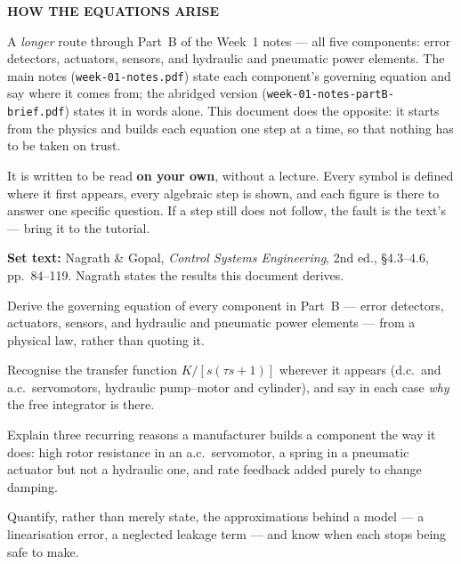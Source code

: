 \documentclass[11pt,a4paper]{article}
\begin{document}
\weektitle

\begin{center}
{\large\sffamily\bfseries\color{fnavy}HOW THE EQUATIONS ARISE}
\end{center}

\bigskip
\begin{readingbox}
A \emph{longer} route through Part~B of the Week~1 notes --- all five
components: error detectors, actuators, sensors, and hydraulic and pneumatic
power elements. The main notes (\texttt{week-01-notes.pdf}) state each
component's governing equation and say where it comes from; the abridged
version (\texttt{week-01-notes-partB-brief.pdf}) states it in words alone.
This document does the opposite: it starts from the physics and builds each
equation one step at a time, so that nothing has to be taken on trust.

\smallskip
It is written to be read \textbf{on your own}, without a lecture. Every
symbol is defined where it first appears, every algebraic step is shown, and
each figure is there to answer one specific question. If a step still does
not follow, the fault is the text's --- bring it to the tutorial.

\smallskip
\textbf{Set text:} Nagrath \& Gopal, \emph{Control Systems Engineering}, 2nd
ed., \S4.3--4.6, pp.~84--119. Nagrath states the results this document
derives.
\end{readingbox}

\bigskip
\begin{outcomes}
\item Derive the governing equation of every component in Part~B --- error
      detectors, actuators, sensors, and hydraulic and pneumatic power
      elements --- from a physical law, rather than quoting it.
\item Recognise the transfer function $K/[s(\tau s+1)]$ wherever it appears
      (d.c.\ and a.c.\ servomotors, hydraulic pump--motor and cylinder), and
      say in each case \emph{why} the free integrator is there.
\item Explain three recurring reasons a manufacturer builds a component the
      way it does: high rotor resistance in an a.c.\ servomotor, a spring in
      a pneumatic actuator but not a hydraulic one, and rate feedback added
      purely to change damping.
\item Quantify, rather than merely state, the approximations behind a model
      --- a linearisation error, a neglected leakage term --- and know when
      each stops being safe to make.
\end{outcomes}
\end{document}
